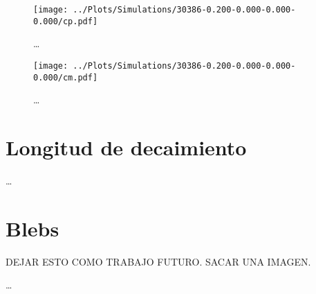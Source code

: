 \begin{figure}
  \centering
  \texttt{[image: ../Plots/Simulations/30386-0.200-0.000-0.000-0.000/cp.pdf]}
  \caption{\dots}
  \label{fig:cp_i}
\end{figure}

\begin{figure}
  \centering
  \texttt{[image: ../Plots/Simulations/30386-0.200-0.000-0.000-0.000/cm.pdf]}
  \caption{\dots}
  \label{fig:cm_i}
\end{figure}

\section{Longitud de decaimiento}

\dots

\section{Blebs}

DEJAR ESTO COMO TRABAJO FUTURO. SACAR UNA IMAGEN.

\dots
